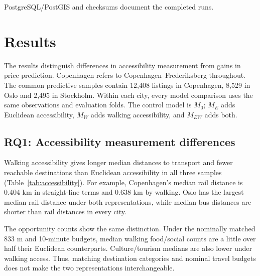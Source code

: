 \documentclass[11pt,a4paper,oneside,openany]{memoir}
\begin{document}
PostgreSQL/PostGIS and checksums document the completed runs.

\chapter{Results}
\label{ch:results}

The results distinguish differences in accessibility measurement from gains in
price prediction. Copenhagen refers to Copenhagen--Frederiksberg throughout.
The common predictive samples contain 12,408 listings in Copenhagen, 8,529 in
Oslo and 2,495 in Stockholm. Within each city, every model comparison uses the
same observations and evaluation folds. The control model is $M_0$; $M_E$ adds
Euclidean accessibility, $M_W$ adds walking accessibility, and $M_{EW}$ adds both.

\section{RQ1: Accessibility measurement differences}
\label{sec:rq1-results}
Walking accessibility gives longer median distances to transport and fewer
reachable destinations than Euclidean accessibility in all three samples
(Table~\ref{tab:accessibility}). For example, Copenhagen's median rail distance
is 0.404 km in straight-line terms and 0.638 km by walking. Oslo has the largest
median rail distance under both representations, while median bus distances
are shorter than rail distances in every city.



The opportunity counts show the same distinction. Under the nominally matched
833 m and 10-minute budgets, median walking food/social counts are a little
over half their Euclidean counterparts. Culture/tourism medians are also lower
under walking access. Thus, matching destination categories and nominal travel
budgets does not make the two representations interchangeable.
\end{document}
